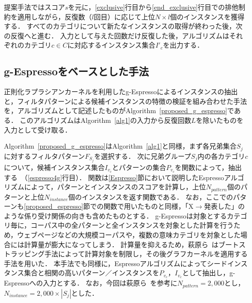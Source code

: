 \documentclass[japanese]{jnlp_1.4}
\begin{document}
提案手法ではスコア$s$を元に，\ref{exclusive}行目から\ref{end_exclusive}行目での排他制約を適用しながら，反復数（$l$回目）に応じて上位$N \times l$個のインスタンスを獲得する．
すべてのカテゴリについて新たなインスタンスの取得が終わった後，次の反復へと進む．
入力として与えた回数だけ反復した後，アルゴリズムはそれぞれのカテゴリ$c \in C$に対応するインスタンス集合$I'_{c}$を出力する．


\subsection{g-Espressoをベースとした手法}
\label{sec:g_espresso}

正則化ラプラシアンカーネルを利用したg-Espressoによるインスタンスの抽出と，フィルタパターンによる候補インスタンスの特徴の検証を組み合わせた手法を，アルゴリズムとして記述したものがAlgorithm~\ref{proposed_g_espresso}である．
このアルゴリズムはAlgorithm~\ref{alg1}の入力から反復回数$L$を除いたものを入力として受け取る．


Algorithm~\ref{proposed_g_espresso}はAlgorithm~\ref{alg1}と同様，まず各兄弟集合$S_{j}$に対するフィルタパターン$F_{S_{j}}$を選択する．
次に兄弟グループ$S_{j}$内の各カテゴリ$c$について，候補インスタンス集合$I_{v_{c}}$とパターンの集合$P_{v_{c}}$を関数によって，抽出する~（\ref{espresso4g}行目）．
関数は\ref{Espresso}節において説明したEspressoアルゴリズムによって，パターンとインスタンスのスコアを計算し，上位$N_{pattern}$個のパターンと上位$N_{instance}$個のインスタンスを返す関数である．
なお，ここでのパターンも\ref{proposed_espresso}節での関数で用いたものと同様，「X$\to$発表した」のような係り受け関係の向きも含めたものとする．
g-Espressoは対象とするカテゴリ毎に，コーパス中の全パターンと全インスタンスを対象とした計算を行うため，ウェブページなどの大規模コーパスや，複数の意味カテゴリを対象とした場合には計算量が膨大になってしまう．
計算量を抑えるため，萩原ら~\cite{masato_hagiwara:2011}はブートストラッピング手法によって計算対象を制限し，その後グラフカーネルを適用する手法を用いた．
本手法でも同様に，Espressoアルゴリズムによってシードインスタンス集合と相関の高いパターン／インスタンスを$P_{v_{c}}$，$I_{v_{c}}$として抽出し，g-Espressoへの入力とする．
なお，今回は萩原ら~\cite{masato_hagiwara:2011}を参考に$N_{pattern}=2,000$とし，$N_{instance}=2,000 \times |S_{j}|$とした．
\end{document}
